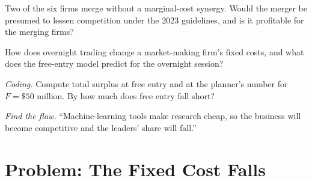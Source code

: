 \begin{exercise}[$\star\star$]\label{exo:fm:competition-and-the-future:5}
Two of the six firms merge without a marginal-cost synergy. Would the merger be presumed to lessen competition under the 2023 guidelines, and is
it profitable for the merging firms?
\end{exercise}

\begin{exercise}[$\star\star$]\label{exo:fm:competition-and-the-future:6}
How does overnight trading change a market-making firm's fixed costs, and what does the free-entry model predict for the overnight session?
\end{exercise}

\begin{exercise}[$\star\star\star$]\label{exo:fm:competition-and-the-future:7}
\emph{Coding.} Compute total surplus at free entry and at the planner's number for $F=\$50$ million. By how much does free entry fall short?
\end{exercise}

\begin{exercise}[$\star\star\star$]\label{exo:fm:competition-and-the-future:8}
\emph{Find the flaw.} ``Machine-learning tools make research cheap, so the business will become competitive and the leaders' share will fall.''
\end{exercise}

\section{Problem: The Fixed Cost Falls}

